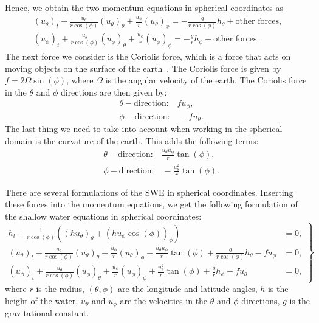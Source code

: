 Hence, we obtain the two momentum equations in spherical coordinates as
\begin{equation}
    \begin{aligned}
         {(u_\theta)}_t + \frac{u_\theta}{r \cos(\phi)} {(u_\theta)}_\theta + \frac{u_\phi}{r} {(u_\theta)}_\phi = -\frac{g}{r \cos(\phi)} h_{\theta} + \text{other forces}, \\
        {( u_\phi)}_t + \frac{u_\theta}{r \cos(\phi)} {(u_\phi)}_\theta   + \frac{u_\phi}{r} {(u_\phi)}_\phi = -\frac{g}{r} h_{\phi} + \text{other forces}.
    \end{aligned}
\end{equation}
The next force we consider is the Coriolis force, which is a force that acts on moving objects on the surface of the earth~\cite{Coriolis}.
The Coriolis force is given by $f = 2 \Omega \sin(\phi)$, where $\Omega$ is the angular velocity of the earth.
The Coriolis force in the $\theta$ and $\phi$ directions are then given by:
\begin{align*}
   &\theta-\text{direction:} \quad f u_\phi,\\
    &\phi-\text{direction:} \quad -f u_\theta.
\end{align*}
The last thing we need to take into account when working in the spherical domain is the curvature of the earth.
This adds the following terms:
\begin{align*}
    &\theta-\text{direction:} \quad \frac{u_\theta u_\phi}{r} \tan(\phi),\\
    &\phi-\text{direction:} \quad -\frac{u_\theta^2}{r} \tan(\phi).
\end{align*}

There are several formulations of the SWE in spherical coordinates.
Inserting these forces into the momentum equations, we get the following formulation of the shallow water equations in spherical coordinates:
\begin{equation}
    \left.
    \begin{aligned}
        h_t + \frac{1}{r \cos (\phi)} \left( {(h u_\theta)}_{\theta} + {(h u_{\phi} \cos(\phi))}_{\phi}  \right) &= 0, \\
        {(u_{\theta})}_t  + \frac{u_\theta}{r \cos (\phi)} {(u_\theta)}_\theta + \frac{u_\phi}{r} {(u_\theta)}_{\phi}
        - \frac{u_\theta u_\phi }{r} \tan(\phi) + \frac{g}{r \cos (\phi)} h_\theta - f u_\phi &= 0, \\
        {(u_{\phi})}_t  + \frac{u_\theta}{r \cos (\phi)} {(u_\phi)}_\theta + \frac{u_\phi}{r} {(u_\phi)}_{\phi}
        + \frac{u_\theta^2}{r} \tan(\phi) + \frac{g}{r} h_\phi + f u_\theta &= 0,
    \end{aligned}
    \right\}
\end{equation}
where $r$ is the radius, $(\theta, \phi)$ are the longitude and latitude angles, $h$ is the height of the water, $u_\theta$ and $u_\phi$ are the velocities in the $\theta$ and $\phi$ directions, $g$ is the gravitational constant.

